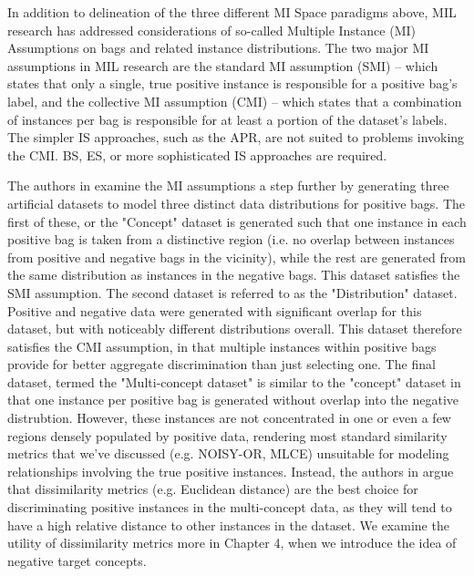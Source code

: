 \documentclass[12pt,dvips]{report}
\numberwithin{equation}{section}
\begin{document}
In addition to delineation of the three different MI Space paradigms above, MIL research has addressed considerations of so-called Multiple Instance (MI) Assumptions \cite{amor13} on bags and related instance distributions.  The two major MI assumptions in MIL research are the standard MI assumption (SMI) \cite{amor13} -- which states that only a single, true positive instance is responsible for a positive bag's label,  and the collective MI assumption (CMI) \cite{amor13} -- which states that a combination of instances per bag is responsible for at least a portion of the dataset's labels.  The simpler IS approaches, such as the APR, are not suited to problems invoking the CMI.  BS, ES, or more sophisticated IS approaches are required.  

The authors in \cite{chap14} examine the MI assumptions a step further by generating three artificial datasets to model three distinct data distributions for positive bags.  The first of these, or the "Concept" dataset is generated such that one instance in each positive bag is taken from a distinctive region (i.e. no overlap between instances from positive and negative bags in the vicinity), while the rest are generated from the same distribution as instances in the negative bags.  This dataset satisfies the SMI assumption.   The second dataset is referred to as the "Distribution" dataset.  Positive and negative data were generated with significant overlap for this dataset, but with noticeably different distributions overall.  This dataset therefore satisfies the CMI assumption, in that multiple instances within positive bags provide for better aggregate discrimination than just selecting one.  The final dataset, termed the "Multi-concept dataset" is similar to the "concept" dataset in that one instance per positive bag is generated without overlap into the negative distrubtion.  However, these instances are not concentrated in one or even a few regions densely populated by positive data, rendering most standard similarity metrics that we've discussed (e.g. NOISY-OR, MLCE) unsuitable for modeling relationships involving the true positive instances.  Instead, the authors in \cite{chap14} argue that dissimilarity metrics (e.g. Euclidean distance) are the best choice for discriminating positive instances in the multi-concept data, as they will tend to have a high relative distance to other instances in the dataset.  We examine the utility of dissimilarity metrics more in Chapter 4, when we introduce the idea of negative target concepts.
\end{document}
